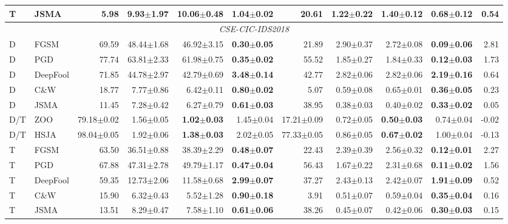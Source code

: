 \begin{tabular}{@{}llrrrrrrrrr@{}}
T & JSMA & 5.98 & 9.93$\pm$1.97 & 10.06$\pm$0.48 & \textbf{1.04$\pm$0.02} & 20.61 & 1.22$\pm$0.22 & 1.40$\pm$0.12 & \textbf{0.68$\pm$0.12} & 0.54\\
\midrule
\multicolumn{11}{c}{\emph{CSE-CIC-IDS2018}}\\
\midrule
D & FGSM & 69.59 & 48.44$\pm$1.68 & 46.92$\pm$3.15 & \textbf{0.30$\pm$0.05} & 21.89 & 2.90$\pm$0.37 & 2.72$\pm$0.08 & \textbf{0.09$\pm$0.06} & 2.81\\
D & PGD & 77.74 & 63.81$\pm$2.33 & 61.98$\pm$0.75 & \textbf{0.35$\pm$0.02} & 55.52 & 1.85$\pm$0.27 & 1.84$\pm$0.33 & \textbf{0.12$\pm$0.03} & 1.73\\
D & DeepFool & 71.85 & 44.78$\pm$2.97 & 42.79$\pm$0.69 & \textbf{3.48$\pm$0.14} & 42.77 & 2.82$\pm$0.06 & 2.82$\pm$0.06 & \textbf{2.19$\pm$0.16} & 0.64\\
D & C\&W & 18.77 & 7.77$\pm$0.86 & 6.42$\pm$0.11 & \textbf{0.80$\pm$0.02} & 5.07 & 0.59$\pm$0.08 & 0.65$\pm$0.01 & \textbf{0.36$\pm$0.05} & 0.23\\
D & JSMA & 11.45 & 7.28$\pm$0.42 & 6.27$\pm$0.79 & \textbf{0.61$\pm$0.03} & 38.95 & 0.38$\pm$0.03 & 0.40$\pm$0.02 & \textbf{0.33$\pm$0.02} & 0.05\\
D/T & ZOO & 79.18$\pm$0.02 & 1.56$\pm$0.05 & \textbf{1.02$\pm$0.03} & 1.45$\pm$0.04 & 17.21$\pm$0.09 & 0.72$\pm$0.05 & \textbf{0.50$\pm$0.03} & 0.74$\pm$0.04 & -0.02\\
D/T & HSJA & 98.04$\pm$0.05 & 1.92$\pm$0.06 & \textbf{1.38$\pm$0.03} & 2.02$\pm$0.05 & 77.33$\pm$0.05 & 0.86$\pm$0.05 & \textbf{0.67$\pm$0.02} & 1.00$\pm$0.04 & -0.13\\
T & FGSM & 63.50 & 36.51$\pm$0.88 & 38.39$\pm$2.29 & \textbf{0.48$\pm$0.07} & 22.43 & 2.39$\pm$0.39 & 2.56$\pm$0.32 & \textbf{0.12$\pm$0.01} & 2.27\\
T & PGD & 67.88 & 47.31$\pm$2.78 & 49.79$\pm$1.17 & \textbf{0.47$\pm$0.04} & 56.43 & 1.67$\pm$0.22 & 2.31$\pm$0.68 & \textbf{0.11$\pm$0.02} & 1.56\\
T & DeepFool & 59.35 & 12.73$\pm$2.06 & 11.58$\pm$0.68 & \textbf{2.99$\pm$0.07} & 37.27 & 2.43$\pm$0.13 & 2.42$\pm$0.07 & \textbf{1.91$\pm$0.09} & 0.52\\
T & C\&W & 15.90 & 6.32$\pm$0.43 & 5.52$\pm$1.28 & \textbf{0.90$\pm$0.18} & 3.91 & 0.51$\pm$0.07 & 0.59$\pm$0.04 & \textbf{0.35$\pm$0.04} & 0.16\\
T & JSMA & 13.51 & 8.29$\pm$0.47 & 7.58$\pm$1.10 & \textbf{0.61$\pm$0.06} & 38.26 & 0.45$\pm$0.07 & 0.42$\pm$0.06 & \textbf{0.30$\pm$0.03} & 0.15\\
\bottomrule
\end{tabular}
